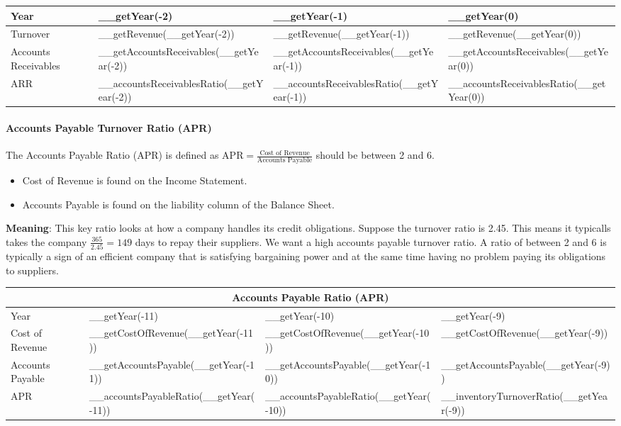 \begin{tabularx}{\textwidth}{|X|X|X|X|}
 \hline
 Year                     & __getYear(-2)                             & __getYear(-1)                             & __getYear(0)                             \\
 \hline
 Turnover                 & __getRevenue(__getYear(-2))               & __getRevenue(__getYear(-1))               & __getRevenue(__getYear(0))               \\
 Accounts Receivables     & __getAccountsReceivables(__getYear(-2))   & __getAccountsReceivables(__getYear(-1))   & __getAccountsReceivables(__getYear(0))   \\
 \rowcolor{lightgray} ARR & __accountsReceivablesRatio(__getYear(-2)) & __accountsReceivablesRatio(__getYear(-1)) & __accountsReceivablesRatio(__getYear(0)) \\
 \hline
\end{tabularx}

\paragraph{Accounts Payable Turnover Ratio (APR)}

The Accounts Payable Ratio (APR) is defined as
$\text{APR} = \frac{\text{Cost of Revenue}}{\text{Accounts Payable}}$ should be
between 2 and 6.
\begin{itemize}
    \item Cost of Revenue is found on the Income Statement.
    \item Accounts Payable is found on the liability column of the Balance Sheet.
\end{itemize}
\textbf{Meaning}: This key ratio looks at how a company handles its credit
obligations. Suppose the turnover ratio is 2.45. This means it typicalls takes
the company $\frac{\text{365}}{2.45} = 149$ days to repay their suppliers. We want
a high accounts payable turnover ratio. A ratio of between 2 and 6 is typically
a sign of an efficient company that is satisfying bargaining power and at the same
time having no problem paying its obligations to suppliers.\\

\begin{tabularx}{\textwidth}{|X|X|X|X|}
 \hline
 \multicolumn{4}{|c|}{Accounts Payable Ratio (APR)} \\
 \hline
 Year                     & __getYear(-11)                         & __getYear(-10)                         & __getYear(-9)                           \\
 \hline
 Cost of Revenue          & __getCostOfRevenue(__getYear(-11))     & __getCostOfRevenue(__getYear(-10))     & __getCostOfRevenue(__getYear(-9))       \\
 Accounts Payable         & __getAccountsPayable(__getYear(-11))   & __getAccountsPayable(__getYear(-10))   & __getAccountsPayable(__getYear(-9))     \\
 \rowcolor{lightgray} APR & __accountsPayableRatio(__getYear(-11)) & __accountsPayableRatio(__getYear(-10)) & __inventoryTurnoverRatio(__getYear(-9)) \\
 \hline
\end{tabularx}\\

